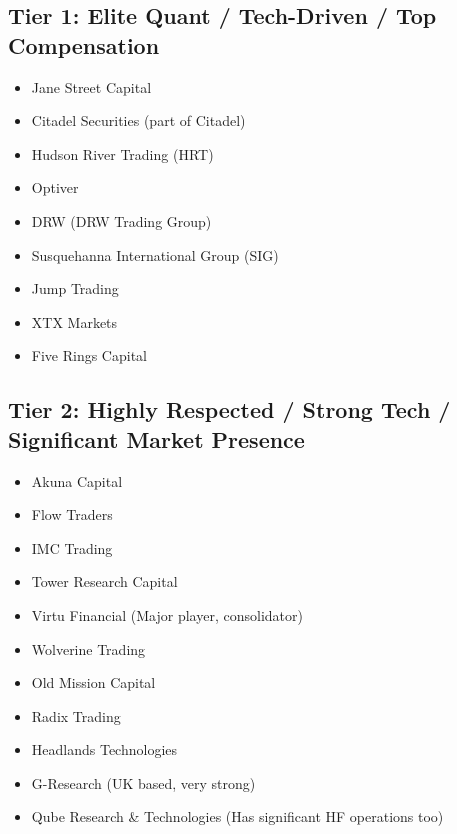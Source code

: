 \documentclass[11pt,a4paper]{article}
\begin{document}
\subsection*{Tier 1: Elite Quant / Tech-Driven / Top Compensation}
\begin{multicols}{3}
\begin{itemize}[label=\textbullet, leftmargin=*, itemsep=1pt, parsep=0pt]
    \item Jane Street Capital
    \item Citadel Securities (part of Citadel)
    \item Hudson River Trading (HRT)
    \item Optiver
    \item DRW (DRW Trading Group)
    \item Susquehanna International Group (SIG)
    \item Jump Trading
    \item XTX Markets
    \item Five Rings Capital
\end{itemize}
\end{multicols}

\subsection*{Tier 2: Highly Respected / Strong Tech / Significant Market Presence}
\begin{multicols}{3}
\begin{itemize}[label=\textbullet, leftmargin=*, itemsep=1pt, parsep=0pt]
    \item Akuna Capital
    \item Flow Traders
    \item IMC Trading
    \item Tower Research Capital
    \item Virtu Financial (Major player, consolidator)
    \item Wolverine Trading
    \item Old Mission Capital
    \item Radix Trading
    \item Headlands Technologies
    \item G-Research (UK based, very strong)
    \item Qube Research \& Technologies (Has significant HF operations too)
\end{itemize}
\end{multicols}
\end{document}
